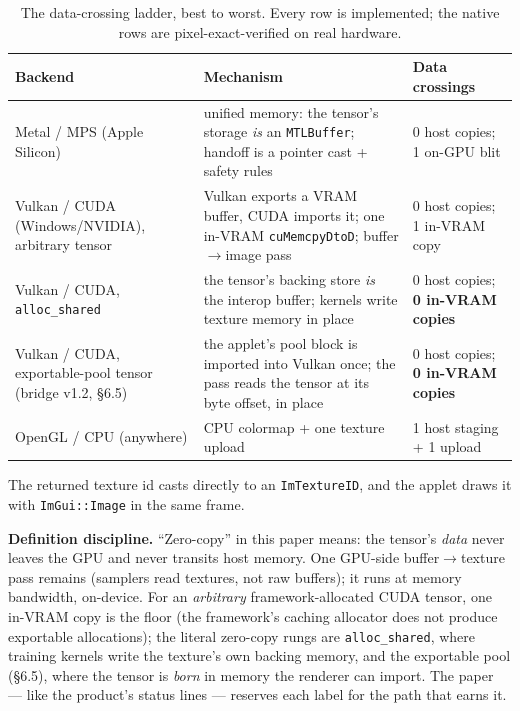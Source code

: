 \documentclass[11pt]{article}
\begin{document}
\begin{table}[ht]
\centering\footnotesize
\begin{tabular}{@{}p{}p{}p{}@{}}
\toprule
Backend & Mechanism & Data crossings \\
\midrule
Metal / MPS (Apple Silicon) &
  unified memory: the tensor's storage \emph{is} an \texttt{MTLBuffer};
  handoff is a pointer cast + safety rules &
  0 host copies; 1 on-GPU blit \\
\addlinespace
Vulkan / CUDA (Win\-dows/NVIDIA), arbitrary tensor &
  Vulkan exports a VRAM buffer, CUDA imports it; one in-VRAM
  \texttt{cuMemcpyDtoD}; buffer$\rightarrow$image pass &
  0 host copies; 1 in-VRAM copy \\
\addlinespace
Vulkan / CUDA, \texttt{alloc\_shared} &
  the tensor's backing store \emph{is} the interop buffer; kernels write
  texture memory in place &
  0 host copies; \textbf{0 in-VRAM copies} \\
\addlinespace
Vulkan / CUDA, exportable-pool tensor (bridge v1.2, \S6.5) &
  the applet's pool block is imported into Vulkan once; the pass reads the
  tensor at its byte offset, in place &
  0 host copies; \textbf{0 in-VRAM copies} \\
\addlinespace
OpenGL / CPU (anywhere) &
  CPU colormap + one texture upload &
  1 host staging + 1 upload \\
\bottomrule
\end{tabular}
\caption{The data-crossing ladder, best to worst. Every row is implemented;
the native rows are pixel-exact-verified on real hardware.}
\label{tab:ladder}
\end{table}

The returned texture id casts directly to an \texttt{ImTextureID}, and the
applet draws it with \texttt{ImGui::Image} in the same frame.

\textbf{Definition discipline.} ``Zero-copy'' in this paper means: the
tensor's \emph{data} never leaves the GPU and never transits host memory. One
GPU-side buffer$\rightarrow$texture pass remains (samplers read textures, not
raw buffers); it runs at memory bandwidth, on-device. For an \emph{arbitrary}
framework-allocated CUDA tensor, one in-VRAM copy is the floor (the
framework's caching allocator does not produce exportable allocations); the
literal zero-copy rungs are \texttt{alloc\_shared}, where training kernels
write the texture's own backing memory, and the exportable pool (\S6.5),
where the tensor is \emph{born} in memory the renderer can import. The paper
--- like the product's status lines --- reserves each label for the path that
earns it.
\end{document}
